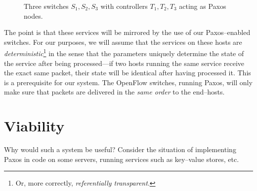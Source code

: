 \begin{figure}[H]
  \centering
  \caption{Three switches $S_1, S_2, S_3$ with controllers $T_1, T_2, T_3$ acting as Paxos nodes.}
  \label{figure:graph.three.switches}
\end{figure}

The point is that these services will be mirrored by the use of our
Paxos--enabled switches.  For our purposes, we will assume that the services
on these hosts are \textit{deterministic}\footnote{Or, more correctly,
\textit{referentially transparent}.} in the sense that the parameters
uniquely determine the state of the service after being processed---if two
hosts running the same service receive the exact same packet, their state
will be identical after having processed it.  This is a prerequisite for our
system.  The OpenFlow switches, running Paxos, will only make sure that
packets are delivered in the \textit{same order} to the end--hosts.

\section{Viability}

Why would such a system be useful? Consider the situation of implementing
Paxos in code on some servers, running services such as key--value stores,
etc.

